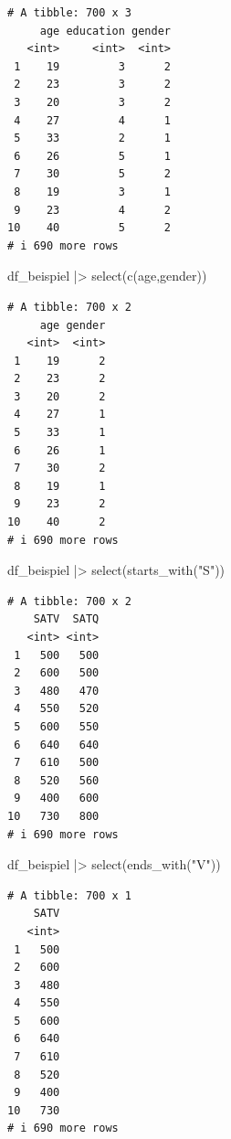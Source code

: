 \documentclass[
  letterpaper,
  DIV=11,
  numbers=noendperiod]{scrreprt}
\newenvironment{Shaded}{\begin{snugshade}}{\end{snugshade}}
\newcommand{\FunctionTok}[1]{\textcolor[rgb]{0.28,0.35,0.67}{#1}}
\newcommand{\NormalTok}[1]{\textcolor[rgb]{0.00,0.23,0.31}{#1}}
\newcommand{\SpecialCharTok}[1]{\textcolor[rgb]{0.37,0.37,0.37}{#1}}
\newcommand{\StringTok}[1]{\textcolor[rgb]{0.13,0.47,0.30}{#1}}
\begin{document}
\begin{verbatim}
# A tibble: 700 x 3
     age education gender
   <int>     <int>  <int>
 1    19         3      2
 2    23         3      2
 3    20         3      2
 4    27         4      1
 5    33         2      1
 6    26         5      1
 7    30         5      2
 8    19         3      1
 9    23         4      2
10    40         5      2
# i 690 more rows
\end{verbatim}

\begin{Shaded}
\begin{Highlighting}[]
\NormalTok{df\_beispiel }\SpecialCharTok{|\textgreater{}} \FunctionTok{select}\NormalTok{(}\FunctionTok{c}\NormalTok{(age,gender))}
\end{Highlighting}
\end{Shaded}

\begin{verbatim}
# A tibble: 700 x 2
     age gender
   <int>  <int>
 1    19      2
 2    23      2
 3    20      2
 4    27      1
 5    33      1
 6    26      1
 7    30      2
 8    19      1
 9    23      2
10    40      2
# i 690 more rows
\end{verbatim}

\begin{Shaded}
\begin{Highlighting}[]
\NormalTok{df\_beispiel }\SpecialCharTok{|\textgreater{}} \FunctionTok{select}\NormalTok{(}\FunctionTok{starts\_with}\NormalTok{(}\StringTok{"S"}\NormalTok{))}
\end{Highlighting}
\end{Shaded}

\begin{verbatim}
# A tibble: 700 x 2
    SATV  SATQ
   <int> <int>
 1   500   500
 2   600   500
 3   480   470
 4   550   520
 5   600   550
 6   640   640
 7   610   500
 8   520   560
 9   400   600
10   730   800
# i 690 more rows
\end{verbatim}

\begin{Shaded}
\begin{Highlighting}[]
\NormalTok{df\_beispiel }\SpecialCharTok{|\textgreater{}} \FunctionTok{select}\NormalTok{(}\FunctionTok{ends\_with}\NormalTok{(}\StringTok{"V"}\NormalTok{))}
\end{Highlighting}
\end{Shaded}

\begin{verbatim}
# A tibble: 700 x 1
    SATV
   <int>
 1   500
 2   600
 3   480
 4   550
 5   600
 6   640
 7   610
 8   520
 9   400
10   730
# i 690 more rows
\end{verbatim}
\end{document}
